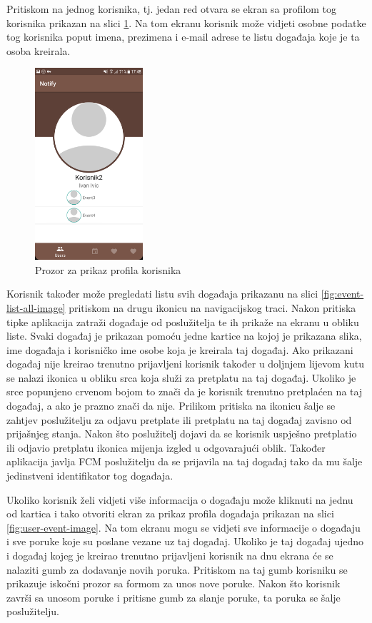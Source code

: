\documentclass[times, utf8, zavrsni]{fer}
\begin{document}
Pritiskom na jednog korisnika, tj. jedan red otvara se ekran sa profilom tog korisnika prikazan na slici \ref{fig:user-profile-image}. Na tom ekranu korisnik može vidjeti osobne podatke tog korisnika poput imena, prezimena i e-mail adrese te listu događaja koje je ta osoba kreirala.

\begin{figure}[htb]
\centering
\includegraphics[width=4cm]{img/ss-user-profile.png}
\caption{Prozor za prikaz profila korisnika}
\label{fig:user-profile-image}
\end{figure}

Korisnik također može pregledati listu svih događaja prikazanu na slici \ref{fig:event-list-all-image} pritiskom na drugu ikonicu na navigacijskog traci. Nakon pritiska tipke aplikacija zatraži događaje od poslužitelja te ih prikaže na ekranu u obliku liste. Svaki događaj je prikazan pomoću jedne kartice na kojoj je prikazana slika, ime događaja i korisničko ime osobe koja je kreirala taj događaj. Ako prikazani događaj nije kreirao trenutno prijavljeni korisnik također u doljnjem lijevom kutu se nalazi ikonica u obliku srca koja služi za pretplatu na taj događaj. Ukoliko je srce popunjeno crvenom bojom to znači da je korisnik trenutno pretplaćen na taj događaj, a ako je prazno znači da nije. Prilikom pritiska na ikonicu šalje se zahtjev poslužitelju za odjavu pretplate ili pretplatu na taj događaj zavisno od prijašnjeg stanja. Nakon što poslužitelj dojavi da se korisnik uspješno pretplatio ili odjavio pretplatu ikonica mijenja izgled u odgovarajući oblik. Također aplikacija javlja FCM poslužitelju da se prijavila na taj događaj tako da mu šalje jedinstveni identifikator tog događaja.

Ukoliko korisnik želi vidjeti više informacija o događaju može kliknuti na jednu od kartica i tako otvoriti ekran za prikaz profila događaja prikazan na slici \ref{fig:user-event-image}. Na tom ekranu mogu se vidjeti sve informacije o događaju i sve poruke koje su poslane vezane uz taj događaj. Ukoliko je taj događaj ujedno i događaj kojeg je kreirao trenutno prijavljeni korisnik na dnu ekrana će se nalaziti gumb za dodavanje novih poruka. Pritiskom na taj gumb korisniku se prikazuje iskočni prozor sa formom za unos nove poruke. Nakon što korisnik završi sa unosom poruke i pritisne gumb za slanje poruke, ta poruka se šalje poslužitelju.
\end{document}
